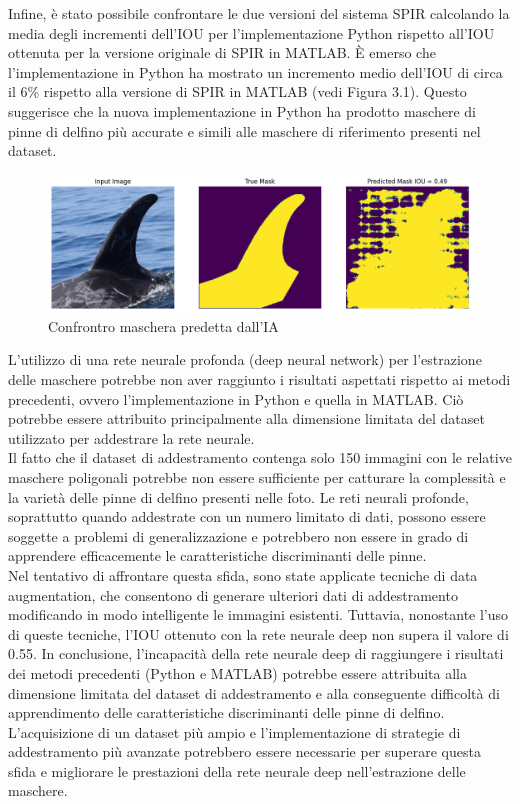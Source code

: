 \documentclass[a4paper,12pt]{report}
\begin{document}
    Infine, è stato possibile confrontare le due versioni del sistema SPIR calcolando la media degli incrementi dell'IOU per l'implementazione Python rispetto all'IOU ottenuta per la versione originale di SPIR in MATLAB.
    È emerso che l'implementazione in Python ha mostrato un incremento medio dell'IOU di circa il 6\% rispetto alla versione di SPIR in MATLAB (vedi Figura 3.1).
    Questo suggerisce che la nuova implementazione in Python ha prodotto maschere di pinne di delfino più accurate e simili alle maschere di riferimento presenti nel dataset.

    \begin{figure}[H]
      \centering
      \includegraphics[width=\textwidth]{assets/images/results/result_mask_deep.png}   
      \caption{Confrontro maschera predetta dall'IA}
    \end{figure}
    L'utilizzo di una rete neurale profonda (deep neural network) per l'estrazione delle maschere potrebbe non aver raggiunto i risultati aspettati rispetto ai metodi precedenti, ovvero l'implementazione in Python e quella in MATLAB. Ciò potrebbe essere attribuito principalmente alla dimensione limitata del dataset utilizzato per addestrare la rete neurale.
    \\
    Il fatto che il dataset di addestramento contenga solo 150 immagini con le relative maschere poligonali potrebbe non essere sufficiente per catturare la complessità e la varietà delle pinne di delfino presenti nelle foto. Le reti neurali profonde, soprattutto quando addestrate con un numero limitato di dati, possono essere soggette a problemi di generalizzazione e potrebbero non essere in grado di apprendere efficacemente le caratteristiche discriminanti delle pinne.
    \\
    Nel tentativo di affrontare questa sfida, sono state applicate tecniche di data augmentation, che consentono di generare ulteriori dati di addestramento modificando in modo intelligente le immagini esistenti. Tuttavia, nonostante l'uso di queste tecniche, l'IOU ottenuto con la rete neurale deep non supera il valore di 0.55.
    In conclusione, l'incapacità della rete neurale deep di raggiungere i risultati dei metodi precedenti (Python e MATLAB) potrebbe essere attribuita alla dimensione limitata del dataset di addestramento e alla conseguente difficoltà di apprendimento delle caratteristiche discriminanti delle pinne di delfino. L'acquisizione di un dataset più ampio e l'implementazione di strategie di addestramento più avanzate potrebbero essere necessarie per superare questa sfida e migliorare le prestazioni della rete neurale deep nell'estrazione delle maschere.
    \newpage
\end{document}
